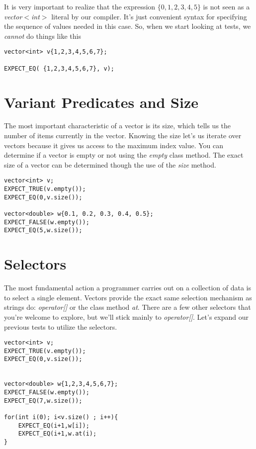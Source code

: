 \documentclass[]{tufte-handout}
\begin{document}
It is very important to realize that the expression $\{0,1,2,3,4,5\}$ is not seen as a \textit{vector$<$int$>$} literal by our compiler. It's just convenient syntax for specifying the sequence of values needed in this case. So, when we start looking at tests, we \textit{cannot} do things like this
\begin{verbatim}
vector<int> v{1,2,3,4,5,6,7};

EXPECT_EQ( {1,2,3,4,5,6,7}, v);
\end{verbatim}

\section{Variant Predicates and Size}

The most important characteristic of a vector is its size, which tells us the number of items currently in the vector.  Knowing the size let's us iterate over vectors because it gives us access to the maximum index value. You can determine if a vector is empty or not using the \textit{empty} class method.  The exact size of a vector can be determined though the use of the \textit{size} method. 
\begin{verbatim}
vector<int> v;
EXPECT_TRUE(v.empty());
EXPECT_EQ(0,v.size());

vector<double> w{0.1, 0.2, 0.3, 0.4, 0.5};
EXPECT_FALSE(w.empty());
EXPECT_EQ(5,w.size());

\end{verbatim}

\section{Selectors}

The most fundamental action a programmer carries out on a collection of data is to select a single element. Vectors provide the exact same selection mechanism as strings do: \textit{operator[]} or the class method \textit{at}. There are a few other selectors that you're welcome to explore, but we'll stick mainly to \textit{operator[]}.  Let's expand our previous tests to utilize the selectors.

\begin{verbatim}
vector<int> v;
EXPECT_TRUE(v.empty());
EXPECT_EQ(0,v.size());


vector<double> w{1,2,3,4,5,6,7};
EXPECT_FALSE(w.empty());
EXPECT_EQ(7,w.size());

for(int i(0); i<v.size() ; i++){
	EXPECT_EQ(i+1,w[i]);
	EXPECT_EQ(i+1,w.at(i);
}
\end{verbatim}
\end{document}
